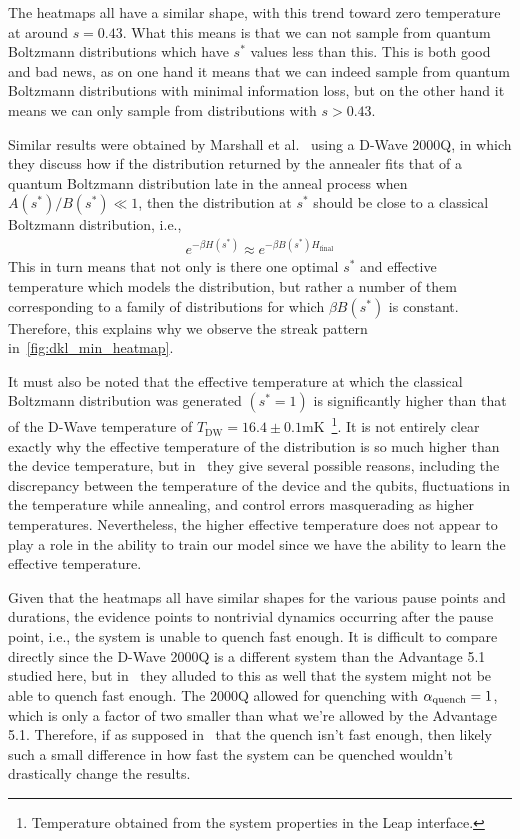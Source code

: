 The heatmaps all have a similar shape, with this trend toward zero temperature at around \( s = 0.43 \).
What this means is that we can not sample from quantum Boltzmann distributions which have \( s^* \) values less than this.
This is both good and bad news, as on one hand it means that we can indeed sample from quantum Boltzmann distributions with minimal information loss, but on the other hand it means we can only sample from distributions with \( s > 0.43 \).

Similar results were obtained by Marshall et al.~\cite{marshall_2019} using a D-Wave 2000Q, in which they discuss how if the distribution returned by the annealer fits that of a quantum Boltzmann distribution late in the anneal process when \( A(s^*) / B(s^*) \ll 1 \), then the distribution at \( s^* \) should be close to a classical Boltzmann distribution, i.e.,
\begin{align}
    e^{-\beta H(s^*)} \approx e^{-\beta B(s^*) H_\text{final}}
\end{align}
This in turn means that not only is there one optimal \( s^* \) and effective temperature which models the distribution, but rather a number of them corresponding to a family of distributions for which \( \beta B(s^*) \) is constant.
Therefore, this explains why we observe the streak pattern in~\cref{fig:dkl_min_heatmap}.

It must also be noted that the effective temperature at which the classical Boltzmann distribution was generated \( (s^* = 1) \) is significantly higher than that of the D-Wave temperature of \( T_\text{DW} = 16.4 \pm 0.1 \si{\milli\kelvin} \)~\cite{dwave_leap}\footnote{Temperature obtained from the system properties in the Leap interface.}.
It is not entirely clear exactly why the effective temperature of the distribution is so much higher than the device temperature, but in~\cite{marshall_2019} they give several possible reasons, including the discrepancy between the temperature of the device and the qubits, fluctuations in the temperature while annealing, and control errors masquerading as higher temperatures.
Nevertheless, the higher effective temperature does not appear to play a role in the ability to train our model since we have the ability to learn the effective temperature.

Given that the heatmaps all have similar shapes for the various pause points and durations, the evidence points to nontrivial dynamics occurring after the pause point, i.e., the system is unable to quench fast enough.
It is difficult to compare directly since the D-Wave 2000Q is a different system than the Advantage 5.1 studied here, but in~\cite{marshall_2019} they alluded to this as well that the system might not be able to quench fast enough.
The 2000Q allowed for quenching with \( \alpha_{\text{quench}} = 1 \), which is only a factor of two smaller than what we're allowed by the Advantage 5.1.
Therefore, if as supposed in~\cite{marshall_2019} that the quench isn't fast enough, then likely such a small difference in how fast the system can be quenched wouldn't drastically change the results.

